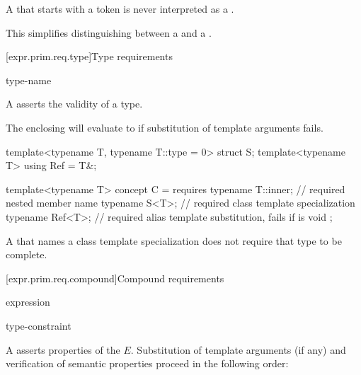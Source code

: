 \pnum
A  that starts with a  token
is never interpreted as a .
\begin{note}
This simplifies distinguishing between a 
and a .
\end{note}

[expr.prim.req.type]{Type requirements}
%

\begin{bnf}
\br
      type-name \terminal{;}
\end{bnf}

\pnum
A  asserts the validity of a type.
\begin{note}
The enclosing  will evaluate to 
if substitution of template arguments fails.
\end{note}
\begin{example}
\begin{codeblock}
template<typename T, typename T::type = 0> struct S;
template<typename T> using Ref = T&;

template<typename T> concept C = requires {
  typename T::inner;    // required nested member name
  typename S<T>;        // required class template specialization
  typename Ref<T>;      // required alias template substitution, fails if  is void
};
\end{codeblock}
\end{example}

\pnum
A  that names a class template specialization
does not require that type to be complete.

[expr.prim.req.compound]{Compound requirements}
%

\begin{bnf}
\br
    \terminal{\{} expression \terminal{\}}   \terminal{;}
\end{bnf}

\begin{bnf}
\br
    \terminal{->} type-constraint
\end{bnf}

\pnum
A  asserts properties
of the  $E$. Substitution
of template arguments (if any) and verification of
semantic properties proceed in the following order:

